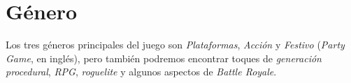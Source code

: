 \section{G\'enero}

Los tres géneros principales del juego son \emph{Plataformas}, \emph{Acción} y
\emph{Festivo} (\emph{Party Game}, en inglés), pero también podremos encontrar
toques de \emph{generación procedural}, \emph{RPG}, \emph{roguelite} y algunos
aspectos de \emph{Battle Royale}.